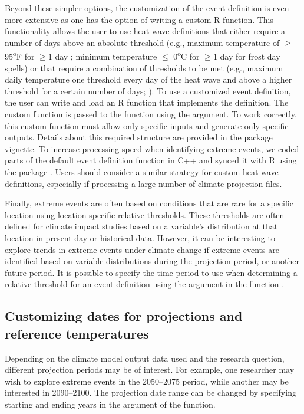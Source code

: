 Beyond these simpler options, the customization of the event definition
is even more extensive as one has the option of writing a custom R
function. This functionality allows the user to use heat wave
definitions that either require a number of days above an absolute
threshold (e.g., maximum temperature of \(\ge\) 95\textsuperscript{o}F
for \(\ge1\) day \citet{kent2014heat, tan2007heat}; minimum temperature
\(\le\) 0\textsuperscript{o}C for \(\ge1\) day for frost day spells) or
that require a combination of thresholds to be met (e.g., maximum daily
temperature one threshold every day of the heat wave and above a higher
threshold for a certain number of days;
\citet{kent2014heat, peng2011toward}). To use a customized event
definition, the user can write and load an R function that implements
the definition. The custom function is passed to the 
function using the  argument. To work
correctly, this custom function must allow only specific inputs and
generate only specific outputs. Details about this required structure
are provided in the  package vignette. To increase
processing speed when identifying extreme events, we coded parts of the
default event definition function in C++ and synced it with R using the
 package \citep{Rcpp}. Users should consider a similar
strategy for custom heat wave definitions, especially if processing a
large number of climate projection files.

Finally, extreme events are often based on conditions that are rare for
a specific location using location-specific relative thresholds. These
thresholds are often defined for climate impact studies based on a
variable's distribution at that location in present-day or historical
data. However, it can be interesting to explore trends in extreme events
under climate change if extreme events are identified based on variable
distributions during the projection period, or another future period. It
is possible to specify the time period to use when determining a
relative threshold for an event definition using the
 argument in the function .

\subsection{Customizing dates for projections and reference
temperatures}\label{customizing-dates-for-projections-and-reference-temperatures}

Depending on the climate model output data used and the research
question, different projection periods may be of interest. For example,
one researcher may wish to explore extreme events in the 2050--2075
period, while another may be interested in 2090--2100. The projection
date range can be changed by specifying starting and ending years in the
 argument of the 
function.

